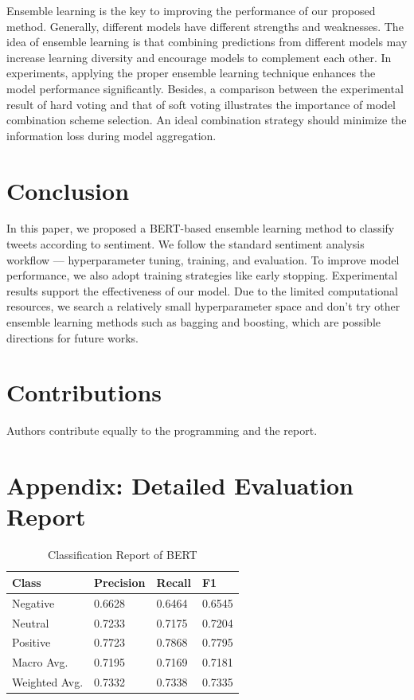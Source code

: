 \documentclass[runningheads]{llncs}
\begin{document}
Ensemble learning is the key to improving the performance of our proposed method. Generally, different models have different strengths and weaknesses. The idea of ensemble learning is that combining predictions from different models may increase learning diversity and encourage models to complement each other. In experiments, applying the proper ensemble learning technique enhances the model performance significantly. Besides, a comparison between the experimental result of hard voting and that of soft voting illustrates the importance of model combination scheme selection. An ideal combination strategy should minimize the information loss during model aggregation.

\section{Conclusion}
In this paper, we proposed a BERT-based ensemble learning method to classify tweets according to sentiment. We follow the standard sentiment analysis workflow --- hyperparameter tuning, training, and evaluation. To improve model performance, we also adopt training strategies like early stopping. Experimental results support the effectiveness of our model. Due to the limited computational resources, we search a relatively small hyperparameter space and don't try other ensemble learning methods such as bagging and boosting, which are possible directions for future works.
 
\section{Contributions}
Authors contribute equally to the programming and the report.

%
%


%

\section*{Appendix: Detailed Evaluation Report}
\begin{table}[!ht]
    \centering
    \caption{Classification Report of BERT}
    \begin{tabular}{llll}
        \toprule
        \textbf{Class} & \textbf{Precision} & \textbf{Recall} & \textbf{F1}\\
        \midrule
         Negative       & 0.6628  & 0.6464  & 0.6545 \\ 
         Neutral       & 0.7233  & 0.7175  & 0.7204 \\
         Positive       & 0.7723  & 0.7868  & 0.7795 \\
        \midrule
   Macro Avg.  & 0.7195  & 0.7169  & 0.7181 \\
Weighted Avg.  & 0.7332  & 0.7338  & 0.7335 \\
        \bottomrule
    \end{tabular}
\end{table}
\end{document}
